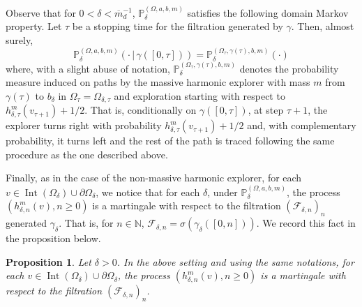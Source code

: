 \documentclass{article}
\newcommand{\PP}{{\mathbb{P}}}
\newtheorem{proposition}[theorem]{Proposition}
\theoremstyle{definition}
\theoremstyle{remark}
\theoremstyle{remark}
\begin{document}
Observe that for $0<\delta < \overline{m}_d^{-1}$, $\PP_{\delta}^{(\Omega,a,b,m)}$ satisfies the following domain Markov property. Let $\tau$ be a stopping time for the filtration generated by $\gamma$. Then, almost surely,
\begin{equation} \label{discrete_DMP}
    \PP_{\delta}^{(\Omega,a,b,m)}(\cdot \, \vert \, \gamma([0,\tau])) = \PP_{\delta}^{(\Omega_{\tau}, \gamma(\tau), b, m)}(\cdot)
\end{equation}
where, with a slight abuse of notation, $\PP_{\delta}^{(\Omega_{\tau}, \gamma(\tau), b, m)}$ denotes the probability measure induced on paths by the massive harmonic explorer with mass $m$ from $\gamma(\tau)$ to $b_\delta$ in $\Omega_{\tau} = \Omega_{\delta,\tau}$ and exploration starting with respect to $h_{\delta,\tau}^{m}(v_{\tau+1}) +1/2$. That is, conditionally on $\gamma([0,\tau])$, at step $\tau+1$, the explorer turns right with probability $h_{\delta,\tau}^{m}(v_{\tau+1}) +1/2$ and, with complementary probability, it turns left and the rest of the path is traced following the same procedure as the one described above.

Finally, as in the case of the non-massive harmonic explorer, for each $v \in \operatorname{Int}(\Omega_{\delta}) \cup \partial \Omega_{\delta}$, we notice that for each $\delta$, under $\mathbb{P}^{(\Omega, a, b, m)}_\delta$, the process $(h_{\delta, n}^m(v), n \geq 0)$ is a martingale with respect to the filtration $(\mathcal{F}_{\delta, n})_n$ generated $\gamma_{\delta}$. That is, for $n \in \mathbb{N}$, $\mathcal{F}_{\delta,n} = \sigma(\gamma_{\delta}([0,n]))$. We record this fact in the proposition below.

\begin{proposition} \label{prop_martingale_obs}
    Let $\delta >0$. In the above setting and using the same notations, for each $v \in \operatorname{Int}(\Omega_{\delta}) \cup \partial \Omega_{\delta}$, the process $(h_{\delta, n}^m(v), n \geq 0)$ is a martingale with respect to the filtration $(\mathcal{F}_{\delta, n})_n$.
\end{proposition}
\end{document}
